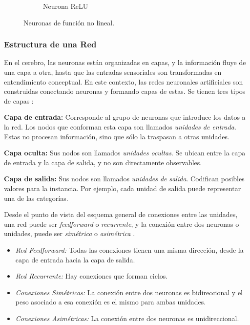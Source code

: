 \begin{figure}[h]
\begin{subfigure}[b]{.45\linewidth}
\caption{Neurona ReLU}\label{fig:relu}
\end{subfigure}
\caption[Neuronas de función no lineal.]{Neuronas de función no lineal.
}
\label{fig:main}
\end{figure}



\subsubsection{Estructura de una Red}

En el cerebro, las neuronas están organizadas en capas, y la información fluye de una capa a otra, hasta que las entradas sensoriales son transformadas en entendimiento conceptual. 
%
En este contexto, las redes neuronales artificiales son construidas conectando neuronas y formando capas de estas. 
%
Se tienen tres tipos de capas \cite{Buduma}:

\textbf{Capa de entrada:} Corresponde al grupo de neuronas que introduce los datos a la red. Los nodos que conforman esta capa son llamados \textit{unidades de entrada}. Estas no procesan información, sino que sólo la traspasan a otras unidades.

\textbf{Capa oculta:} Sus nodos son llamados \textit{unidades ocultas}. Se ubican entre la capa de entrada y la capa de salida, y no son directamente observables.

\textbf{Capa de salida:} Sus nodos son llamados \textit{unidades de salida}. Codifican posibles valores para la instancia. Por ejemplo, cada unidad de salida puede representar una de las categorías.

Desde el punto de vista del esquema general de conexiones entre las  unidades, una red puede ser \emph{feedforward} o \textit{recurrente}, y la conexión entre dos neuronas o unidades, puede ser \textit{simétrica} o \textit{asimétrica} \cite{Fu}.
\begin{itemize}
    \item \textit{Red Feedforward:} Todas las conexiones tienen una misma dirección, desde la capa de entrada hacia la capa de salida.
    \item \textit{Red Recurrente:} Hay conexiones que forman ciclos.
    \item \textit{Conexiones Simétricas:} La conexión entre dos neuronas es bidireccional y el peso asociado a esa conexión es el mismo para ambas unidades.
    \item \textit{Conexiones Asimétricas:} La conexión entre dos neuronas es unidireccional.
\end{itemize}

